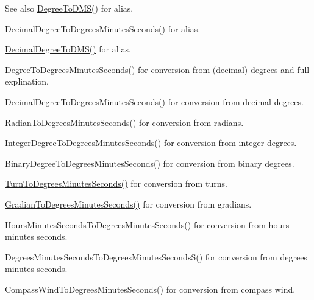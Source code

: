 \begin{DoxySeeAlso}{See also}
\mbox{\hyperlink{group___e_g_x_math-_conversions-_angle_conversions-_degree_ga1096d04647918e20f61fb184ba2a7dce}{Degree\+To\+D\+M\+S()}} for alias. 

\mbox{\hyperlink{group___e_g_x_math-_conversions-_angle_conversions-_decimal_degree_gac5a5255c8d120f71b60d8f60de1a1b6e}{Decimal\+Degree\+To\+Degrees\+Minutes\+Seconds()}} for alias. 

\mbox{\hyperlink{group___e_g_x_math-_conversions-_angle_conversions-_decimal_degree_ga64a1b298ce16e9edf3209b678a7bed46}{Decimal\+Degree\+To\+D\+M\+S()}} for alias. 

\mbox{\hyperlink{group___e_g_x_math-_conversions-_angle_conversions-_degree_ga859585939255d52d010c780c68eb6e23}{Degree\+To\+Degrees\+Minutes\+Seconds()}} for conversion from (decimal) degrees and full explination. 

\mbox{\hyperlink{group___e_g_x_math-_conversions-_angle_conversions-_decimal_degree_gac5a5255c8d120f71b60d8f60de1a1b6e}{Decimal\+Degree\+To\+Degrees\+Minutes\+Seconds()}} for conversion from decimal degrees. 

\mbox{\hyperlink{group___e_g_x_math-_conversions-_angle_conversions-_radian_gadae98c255924fdc8b232b6539eae81a9}{Radian\+To\+Degrees\+Minutes\+Seconds()}} for conversion from radians. 

\mbox{\hyperlink{group___e_g_x_math-_conversions-_angle_conversions-_integer_degree_ga204317877546ea6bbafe5ff558f55a16}{Integer\+Degree\+To\+Degrees\+Minutes\+Seconds()}} for conversion from integer degrees. 

Binary\+Degree\+To\+Degrees\+Minutes\+Seconds() for conversion from binary degrees. 

\mbox{\hyperlink{group___e_g_x_math-_conversions-_angle_conversions-_turn_gaefdee18d878c2e66e7bd737c8900ab30}{Turn\+To\+Degrees\+Minutes\+Seconds()}} for conversion from turns. 

\mbox{\hyperlink{group___e_g_x_math-_conversions-_angle_conversions-_gradian_ga5c81967ddb8f677634d161713174e419}{Gradian\+To\+Degrees\+Minutes\+Seconds()}} for conversion from gradians. 

\mbox{\hyperlink{group___e_g_x_math-_conversions-_angle_conversions-_hours_minutes_seconds_gae9eb0acc65dfe6119936f29ac292afaa}{Hours\+Minutes\+Seconds\+To\+Degrees\+Minutes\+Seconds()}} for conversion from hours minutes seconds. 

Degrees\+Minutes\+Seconds\+To\+Degrees\+Minutes\+Seconds\+S() for conversion from degrees minutes seconds. 

Compass\+Wind\+To\+Degrees\+Minutes\+Seconds() for conversion from compass wind. 
\end{DoxySeeAlso}
\mbox{\label{group___e_g_x_math-_conversions-_angle_conversions-_degree_ga1096d04647918e20f61fb184ba2a7dce}} 
